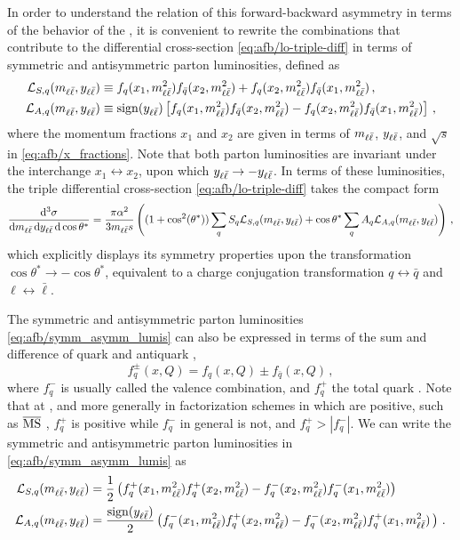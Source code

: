 In order to understand the relation of this forward-backward
asymmetry in terms of the
behavior of the \pdfs, it is convenient
to rewrite the \pdf combinations that contribute to the differential
cross-section \cref{eq:afb/lo-triple-diff} in terms of symmetric and
antisymmetric parton luminosities, defined as
\begin{align}
  \mathcal{L}_{S,q}(m_{\ell\bar{\ell}}, y_{\ell\bar{\ell}}) &\equiv f_q(x_1,m_{\ell\bar{\ell}}^2) f_{\bar{q}}(x_2,m_{\ell\bar{\ell}}^2) + f_q(x_2,m_{\ell\bar{\ell}}^2) f_{\bar{q}}(x_1,m_{\ell\bar{\ell}}^2) \, ,
  \nonumber\\
  \mathcal{L}_{A,q}(m_{\ell\bar{\ell}}, y_{\ell\bar{\ell}}) &\equiv \operatorname{sign} (y_{\ell\bar{\ell}}) \left[ f_q(x_1,m_{\ell\bar{\ell}}^2) f_{\bar{q}}(x_2,m_{\ell\bar{\ell}}^2) - f_q(x_2,m_{\ell\bar{\ell}}^2) f_{\bar{q}}(x_1,m_{\ell\bar{\ell}}^2)\right] \, , \label{eq:afb/symm_asymm_lumis}
\end{align}
where the momentum fractions $x_1$ and $x_2$ are given in terms of $m_{\ell\bar{\ell}}$, $y_{\ell\bar{\ell}}$,
and $\sqrt{s}$ in \cref{eq:afb/x_fractions}.
Note that both parton luminosities are invariant under
the interchange $x_1\leftrightarrow x_2$, upon which $y_{\ell\bar{\ell}} \to -y_{\ell\bar{\ell}}$.
%
In terms of these luminosities, the triple differential cross-section \cref{eq:afb/lo-triple-diff}
takes the compact form
\begin{equation}
  \label{eq:afb/lo-triple-diff-lumis}
  \frac{\dd^3 \sigma}{\dd m_{\ell\bar{\ell}} \, \dd y_{\ell\bar{\ell}} \, \dd\cos\theta^*} =
  \frac{\pi \alpha^2}{3 m_{\ell\bar{\ell}} s} \left( (1+\cos^2({\theta^*})) \sum_q S_q \mathcal{L}_{S,q}(m_{\ell\bar{\ell}}, y_{\ell\bar{\ell}})
  + \cos\theta^* \sum_q A_q \mathcal{L}_{A,q}(m_{\ell\bar{\ell}}, y_{\ell\bar{\ell}})  \right) \, ,
\end{equation}
which explicitly displays
its symmetry properties upon the transformation $\cos\theta^* \to -\cos\theta^*$,
equivalent to a charge conjugation transformation 
$q\leftrightarrow \bar q$ and $\ell \leftrightarrow \bar{\ell} $.

The symmetric and antisymmetric parton luminosities \cref{eq:afb/symm_asymm_lumis} can also be expressed
in terms of the sum and difference of quark and antiquark \pdfs,
\begin{equation}
  \label{eq:afb/fqpm}
  f_{q}^\pm \left( x, Q\right) = f_{q} \left( x, Q\right) \pm f_{\bar{q}} \left( x, Q\right) \, ,
\end{equation}
where $f_{q}^-$ is usually called the valence \pdf combination, and $f_{q}^+$
the total quark \pdf\@. Note that at \lo, and more generally in factorization
schemes in which \pdfs are positive, such as ${\overline{\textrm{MS}}}$ \cite{Candido:2020yat},
$f^+_q$ is positive while $f_q^-$ in general is not, and $f_{q}^+>|f_{q}^-|$.
%
We can write the symmetric and antisymmetric parton luminosities in
\cref{eq:afb/symm_asymm_lumis} as
\begin{align}
  \mathcal{L}_{S,q}(m_{\ell\bar{\ell}}, y_{\ell\bar{\ell}}) &= \frac {1} 2 \left( f_q^+(x_1,m_{\ell\bar{\ell}}^2) f_{q}^+(x_2,m_{\ell\bar{\ell}}^2) - f_q^-(x_2,m_{\ell\bar{\ell}}^2) f_{q}^-(x_1,m_{\ell\bar{\ell}}^2)  \right) \, \label{eq:afb/lumiss_qpm}\\
  \mathcal{L}_{A,q}(m_{\ell\bar{\ell}}, y_{\ell\bar{\ell}}) &= \frac {\operatorname{sign} (y_{\ell\bar{\ell}})} 2 \left( f_q^-(x_1,m_{\ell\bar{\ell}}^2) f_{q}^+(x_2,m_{\ell\bar{\ell}}^2) - f_q^-(x_2,m_{\ell\bar{\ell}}^2) f_{q}^+(x_1,m_{\ell\bar{\ell}}^2)  \, \right) \,. \label{eq:afb/lumisa_qpm}
\end{align}

